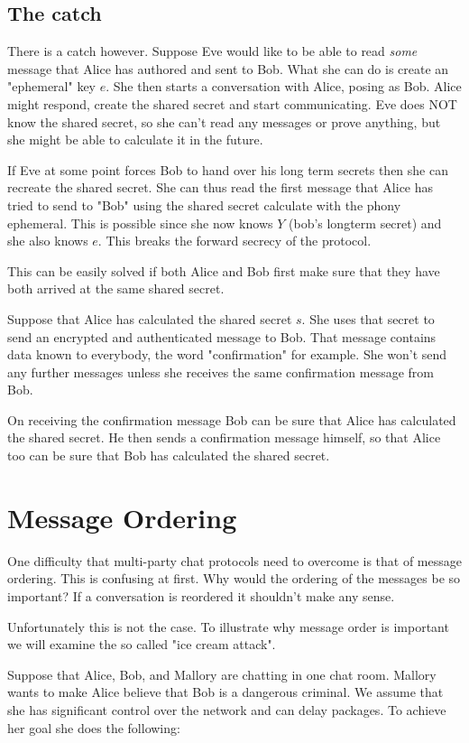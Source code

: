 \subsection{The catch}

There is a catch however. Suppose Eve would like to be able to read \emph{some} message that Alice has authored and sent to Bob.
What she can do is create an "ephemeral" key $e$.
She then starts a conversation with Alice, posing as Bob.
Alice might respond, create the shared secret and start communicating.
Eve does NOT know the shared secret, so she can't read any messages or prove anything, but she might be able to calculate it in the future.

If Eve at some point forces Bob to hand over his long term secrets then she can recreate the shared secret.
She can thus read the first message that Alice has tried to send to "Bob" using the shared secret calculate with the phony ephemeral.
This is possible since she now knows $Y$ (bob's longterm secret) and she also knows $e$.
This breaks the forward secrecy of the protocol.

This can be easily solved if both Alice and Bob first make sure that they have both arrived at the same shared secret.

Suppose that Alice has calculated the shared secret $s$. She uses that secret to send an encrypted and authenticated message to Bob.
That message contains data known to everybody, the word "confirmation" for example.
She won't send any further messages unless she receives the same confirmation message from Bob.

On receiving the confirmation message Bob can be sure that Alice has calculated the shared secret.
He then sends a confirmation message himself, so that Alice too can be sure that Bob has calculated the shared secret.

\section{Message Ordering}

One difficulty that multi-party chat protocols need to overcome is that of message ordering.
This is confusing at first.
Why would the ordering of the messages be so important?
If a conversation is reordered it shouldn't make any sense.

Unfortunately this is not the case.
To illustrate why message order is important we will examine the so called "ice cream attack".

Suppose that Alice, Bob, and Mallory are chatting in one chat room.
Mallory wants to make Alice believe that Bob is a dangerous criminal.
We assume that she has significant control over the network and can delay packages.
To achieve her goal she does the following:

